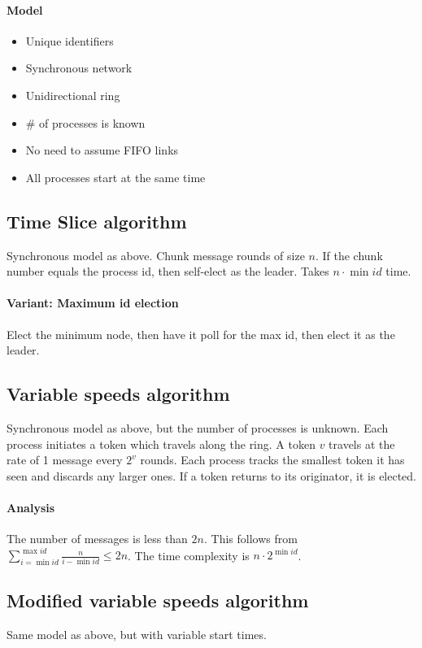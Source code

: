 \documentclass{idc_msc}
\begin{document}
\paragraph{Model}

\begin{itemize}
  \item Unique identifiers
  \item Synchronous network
  \item Unidirectional ring
  \item \# of processes is known
  \item No need to assume FIFO links
  \item All processes start at the same time
\end{itemize}

\subsection{Time Slice algorithm}

Synchronous model as above.
Chunk message rounds of size $n$.
If the chunk number equals the process id, then self-elect as the leader.
Takes $n \cdot \min id$ time.

\paragraph{Variant: Maximum id election}
Elect the minimum node, then have it poll for the max id, then elect it as the leader.

\subsection{Variable speeds algorithm}
Synchronous model as above, but the number of processes is unknown.
Each process initiates a token which travels along the ring.
A token $v$ travels at the rate of 1 message every $2^v$ rounds.
Each process tracks the smallest token it has seen and discards any larger ones.
If a token returns to its originator, it is elected.

\paragraph{Analysis}
The number of messages is less than $2n$.
This follows from $\sum_{i = \min id}^{\max id} \frac{n}{i - \min id} \le 2n$.
The time complexity is $n \cdot 2^{\min id}$.

\subsection{Modified variable speeds algorithm}
Same model as above, but with variable start times.
\end{document}
